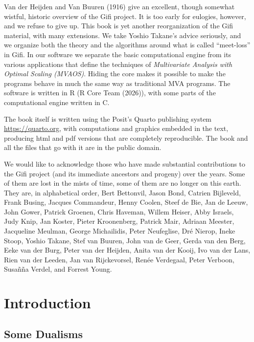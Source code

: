 \documentclass[
  12pt,
  letterpaper,
  DIV=11,
  numbers=noendperiod]{scrreprt}
\begin{document}
Van der Heijden and Van Buuren (1916) give an excellent, though somewhat
wistful, historic overview of the Gifi project. It is too early for
eulogies, however, and we refuse to give up. This book is yet another
reorganization of the Gifi material, with many extensions. We take
Yoshio Takane's advice seriously, and we organize both the theory and
the algorithms around what is called ``meet-loss'' in Gifi. In our
software we separate the basic computational engine from its various
applications that define the techniques of \emph{Multivariate Analysis
with Optimal Scaling (MVAOS)}. Hiding the core makes it possible to make
the programs behave in much the same way as traditional MVA programs.
The software is written in R (R Core Team (2026)), with some parts of
the computational engine written in C.

The book itself is written using the Posit's Quarto publishing system
\url{https://quarto.org}, with computations and graphics embedded in the
text, producing html and pdf versions that are completely reproducible.
The book and all the files that go with it are in the public domain.

We would like to acknowledge those who have made substantial
contributions to the Gifi project (and its immediate ancestors and
progeny) over the years. Some of them are lost in the mists of time,
some of them are no longer on this earth. They are, in alphabetical
order, Bert Bettonvil, Jason Bond, Catrien Bijleveld, Frank Busing,
Jacques Commandeur, Henny Coolen, Steef de Bie, Jan de Leeuw, John
Gower, Patrick Groenen, Chris Haveman, Willem Heiser, Abby Israels, Judy
Knip, Jan Koster, Pieter Kroonenberg, Patrick Mair, Adriaan Meester,
Jacqueline Meulman, George Michailidis, Peter Neufeglise, Dré Nierop,
Ineke Stoop, Yoshio Takane, Stef van Buuren, John van de Geer, Gerda van
den Berg, Eeke van der Burg, Peter van der Heijden, Anita van der Kooij,
Ivo van der Lans, Rien van der Leeden, Jan van Rijckevorsel, Renée
Verdegaal, Peter Verboon, Susañña Verdel, and Forrest Young.


\chapter{Introduction}\label{introduction}

\section{Some Dualisms}\label{some-dualisms}
\end{document}
